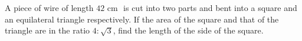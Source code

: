 \documentclass[addpoints, 10pt]{exam}
\begin{document}
\begin{questions}
	\question A piece of wire of length $42 \text{ cm }$ is cut into two parts and bent into a square and an equilateral triangle respectively. If the area of the square and that of the triangle are in the ratio $4:\sqrt{3}$, find the length of the side of the square. 

\end{questions}
\end{document}
